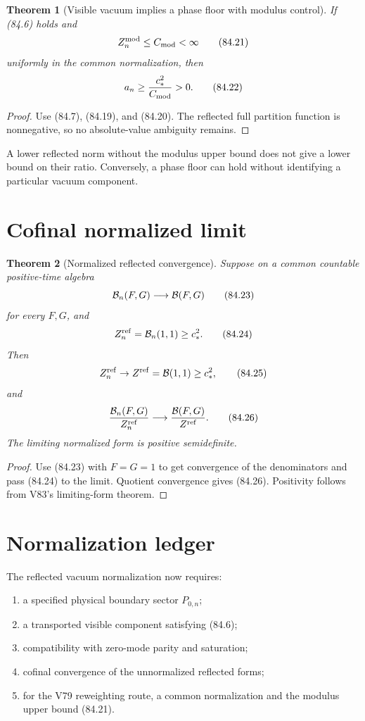 \documentclass[11pt]{article}
\newtheorem{theorem}{Theorem}[section]
\theoremstyle{remark}
\begin{document}
\begin{theorem}[Visible vacuum implies a phase floor with modulus control]
\label{thm:v15v84-phase-floor}
If (84.6) holds and
\[
 Z_n^{\rm mod}\leq C_{\rm mod}<\infty                 \tag{84.21}
\]
uniformly in the common normalization, then
\[
 a_n\geq\frac{c_*^2}{C_{\rm mod}}>0.                  \tag{84.22}
\]
\end{theorem}

\begin{proof}
Use (84.7), (84.19), and (84.20).  The reflected full partition
function is nonnegative, so no absolute-value ambiguity remains.
\end{proof}

A lower reflected norm without the modulus upper bound does not
give a lower bound on their ratio.  Conversely, a phase floor can
hold without identifying a particular vacuum component.

\section{Cofinal normalized limit}

\begin{theorem}[Normalized reflected convergence]
\label{thm:v15v84-limit}
Suppose on a common countable positive-time algebra
\[
 {\cal B}_n(F,G)\longrightarrow{\cal B}(F,G)           \tag{84.23}
\]
for every \(F,G\), and
\[
 Z_n^{\rm ref}={\cal B}_n(1,1)\geq c_*^2.             \tag{84.24}
\]
Then
\[
 Z_n^{\rm ref}\to Z^{\rm ref}={\cal B}(1,1)
 \geq c_*^2,                                          \tag{84.25}
\]
and
\[
 \frac{{\cal B}_n(F,G)}{Z_n^{\rm ref}}
 \longrightarrow
 \frac{{\cal B}(F,G)}{Z^{\rm ref}}.                   \tag{84.26}
\]
The limiting normalized form is positive semidefinite.
\end{theorem}

\begin{proof}
Use (84.23) with \(F=G=1\) to get convergence of the denominators
and pass (84.24) to the limit.  Quotient convergence gives
(84.26).  Positivity follows from V83's limiting-form theorem.
\end{proof}

\section{Normalization ledger}

The reflected vacuum normalization now requires:
\begin{enumerate}
\item a specified physical boundary sector \(P_{0,n}\);
\item a transported visible component satisfying (84.6);
\item compatibility with zero-mode parity and saturation;
\item cofinal convergence of the unnormalized reflected forms;
\item for the V79 reweighting route, a common normalization and
      the modulus upper bound (84.21).
\end{enumerate}
\end{document}
